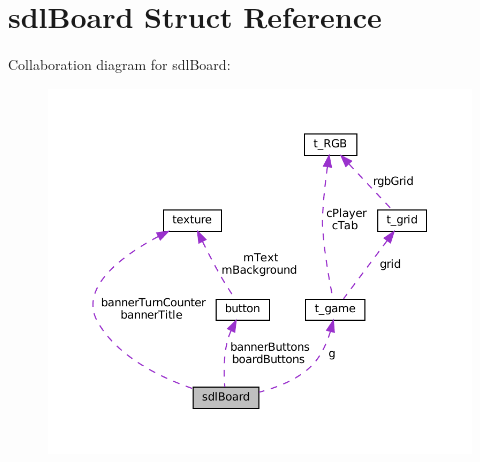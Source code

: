 \hypertarget{structsdl_board}{}\section{sdl\+Board Struct Reference}
\label{structsdl_board}


Collaboration diagram for sdl\+Board\+:
\nopagebreak
\begin{figure}[H]
\begin{center}
\leavevmode
\includegraphics[width=350pt]{structsdl_board__coll__graph}
\end{center}
\end{figure}
